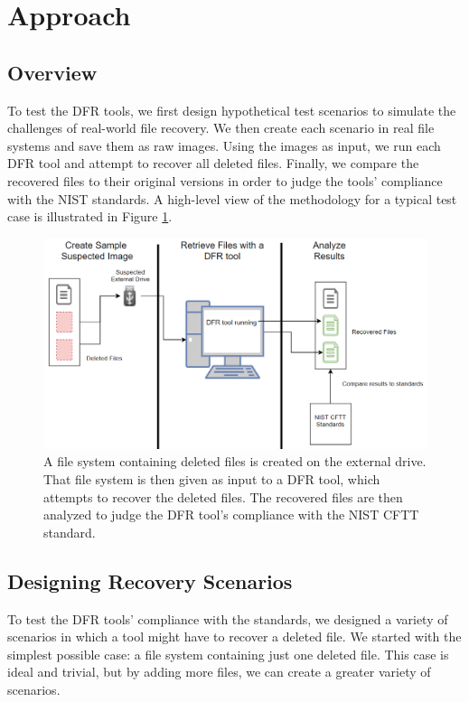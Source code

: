 \section{Approach}

\subsection{Overview}

To test the DFR tools, we first design hypothetical test scenarios to simulate the challenges of real-world file recovery.
We then create each scenario in real file systems and save them as raw images. 
Using the images as input, we run each DFR tool and attempt to recover all deleted files. 
Finally, we compare the recovered files to their original versions in order to judge the tools' 
compliance with the NIST standards. A high-level view of the methodology for a typical test case is illustrated in Figure \ref{fig:overview}.

\begin{figure}[h]
    \centering
    \includegraphics[width=\linewidth]{fig/overview.png}
    \caption{A file system containing deleted files is created on the external drive. That file system is then given as input to a DFR tool, which attempts to recover the deleted files. The recovered files are then analyzed to judge the DFR tool's compliance with the NIST CFTT standard.}
    \label{fig:overview}
\end{figure}

\subsection{Designing Recovery Scenarios}
To test the DFR tools' compliance with the standards, we designed a variety of scenarios in which a tool might have to recover a deleted file. 
We started with the simplest possible case: a file system containing just one deleted file. 
This case is ideal and trivial, but by adding more files, we can create a greater variety of scenarios.

